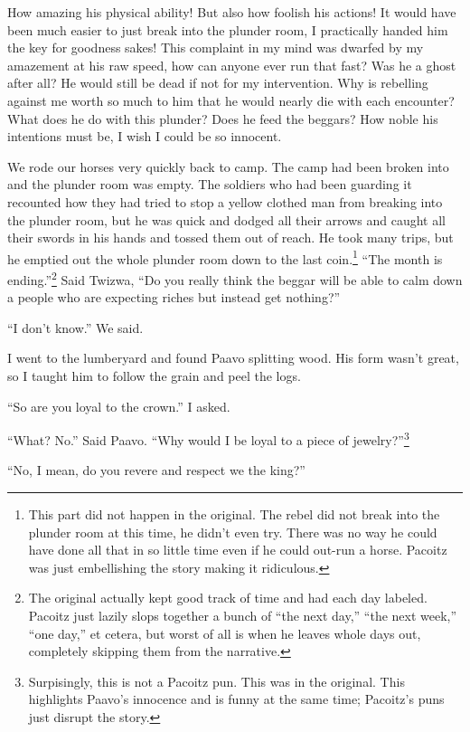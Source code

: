 How amazing his physical ability! But also how foolish his actions! It would have been much easier to just break into the plunder room, I practically handed him the key for goodness sakes! This complaint in my mind was dwarfed by my amazement at his raw speed, how can anyone ever run that fast? Was he a ghost after all? He would still be dead if not for my intervention. Why is rebelling against me worth so much to him that he would nearly die with each encounter? What does he do with this plunder? Does he feed the beggars? How noble his intentions must be, I wish I could be so innocent.

We rode our horses very quickly back to camp. The camp had been broken into and the plunder room was empty. The soldiers who had been guarding it recounted how they had tried to stop a yellow clothed man from breaking into the plunder room, but he was quick and dodged all their arrows and caught all their swords in his hands and tossed them out of reach. He took many trips, but he emptied out the whole plunder room down to the last coin.\footnote{This part did not happen in the original. The rebel did not break into the plunder room at this time, he didn't even try. There was no way he could have done all that in so little time even if he could out-run a horse. Pacoitz was just embellishing the story making it ridiculous.} 
``The month is ending.''\footnote{The original actually kept good track of time and had each day labeled. Pacoitz just lazily slops together a bunch of ``the next day,'' ``the next week,'' ``one day,'' et cetera, but worst of all is when he leaves whole days out, completely skipping them from the narrative.} Said Twizwa, ``Do you really think the beggar will be able to calm down a people who are expecting riches but instead get nothing?''

``I don't know.'' We said.

\tbreak

I went to the lumberyard and found Paavo splitting wood. His form wasn't great, so I taught him to follow the grain and peel the logs.

``So are you loyal to the crown.'' I asked.

``What? No.'' Said Paavo. ``Why would I be loyal to a piece of jewelry?''\footnote{Surpisingly, this is not a Pacoitz pun. This was in the original. This highlights Paavo's innocence and is funny at the same time; Pacoitz's puns just disrupt the story.}

``No, I mean, do you revere and respect we the king?''

